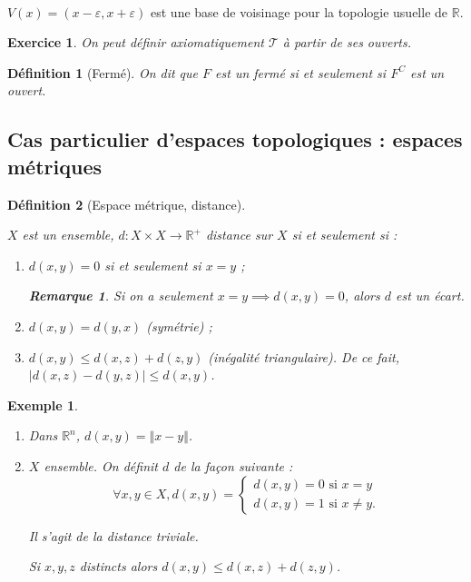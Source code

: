 \documentclass[french]{book}
\newtheorem{definition}{Définition}[section]
\newtheorem*{remark}{Remarque}
\newtheorem{exo}{Exercice}
\newtheorem{exemple}{Exemple}
\begin{document}
\

$V(x) =(x- \varepsilon , x+ \varepsilon )$ est une base de voisinage pour la topologie usuelle de $\mathbb{R}$.

\begin{exo}
  On peut définir axiomatiquement $\mathscr{T} $ à partir de ses ouverts.
\end{exo}

\begin{definition}[Fermé]
  On dit que $F$ est un fermé si et seulement si $F ^{C}$ est un ouvert.
\end{definition}

\subsection{Cas particulier d'espaces topologiques : espaces métriques}



\begin{definition}[Espace métrique, distance] \label{distance}
  \

  $X$ est un ensemble, $d : X \times X \to \mathbb{R} ^{+}$ distance sur $X$ si et seulement si :
  \begin{enumerate}
    \item $d(x, y) = 0$ si et seulement si $x = y$ ;
    \begin{remark}
      Si on a seulement $x =y \implies d(x,y) =0$, alors $d$ est un écart.
    \end{remark}
    \item $d(x,y) = d(y,x)$ (symétrie) ;
    \item $d(x,y) \leq d(x,z) + d(z,y)$ (inégalité triangulaire).
    De ce fait, $\lvert d(x,z) - d(y,z) \rvert \leq d(x,y)$.
  \end{enumerate}
\end{definition}



\begin{exemple}
  \begin{enumerate}
    \item Dans $\mathbb{R}^n$, $d(x,y) = \Vert x-y \Vert $.
    \item $X$ ensemble. On définit $d$ de la façon suivante :
    $$ \forall x, y \in X,  d(x, y) = \begin{cases}
      d(x,y) =0 \text{ si } x=y \\
      d(x,y) = 1 \text{ si } x \neq y.
    \end{cases}$$

    Il s'agit de la distance triviale.

    Si $x,y,z$ distincts alors $d(x,y) \leq d(x,z)+d(z,y)$.
  \end{enumerate}

\end{exemple}
\end{document}

